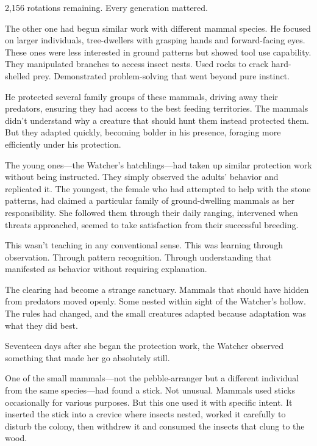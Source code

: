 2,156 rotations remaining. Every generation mattered.

\scenebreak

The other one had begun similar work with different mammal species. He focused on larger individuals, tree-dwellers with grasping hands and forward-facing eyes. These ones were less interested in ground patterns but showed tool use capability. They manipulated branches to access insect nests. Used rocks to crack hard-shelled prey. Demonstrated problem-solving that went beyond pure instinct.

He protected several family groups of these mammals, driving away their predators, ensuring they had access to the best feeding territories. The mammals didn't understand why a creature that should hunt them instead protected them. But they adapted quickly, becoming bolder in his presence, foraging more efficiently under his protection.

The young ones—the Watcher's hatchlings—had taken up similar protection work without being instructed. They simply observed the adults' behavior and replicated it. The youngest, the female who had attempted to help with the stone patterns, had claimed a particular family of ground-dwelling mammals as her responsibility. She followed them through their daily ranging, intervened when threats approached, seemed to take satisfaction from their successful breeding.

This wasn't teaching in any conventional sense. This was learning through observation. Through pattern recognition. Through understanding that manifested as behavior without requiring explanation.

The clearing had become a strange sanctuary. Mammals that should have hidden from predators moved openly. Some nested within sight of the Watcher's hollow. The rules had changed, and the small creatures adapted because adaptation was what they did best.

\scenebreak

Seventeen days after she began the protection work, the Watcher observed something that made her go absolutely still.

One of the small mammals—not the pebble-arranger but a different individual from the same species—had found a stick. Not unusual. Mammals used sticks occasionally for various purposes. But this one used it with specific intent. It inserted the stick into a crevice where insects nested, worked it carefully to disturb the colony, then withdrew it and consumed the insects that clung to the wood.

